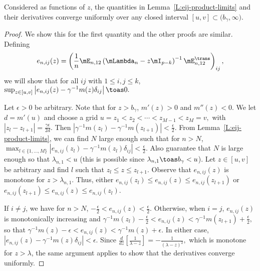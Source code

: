 \begin{lemma}\label{L:eij-product-limits-uniform}
    Considered as functions of $z$, the quantities in 
    Lemma~\ref{L:eij-product-limits} and their derivatives
    converge uniformly over any closed
    interval $[u,v] \subset \big( b_\gamma,\infty \big)$.
\end{lemma}
\begin{proof}
    We show this for the first quantity and the other proofs are similar.
    Defining
    \[
        e_{n,ij}(z)
        =
        \left(
            \frac{1}{n}
            \mE_{n,12}
            \left(
                \mLambda_n - z \mI_{p-k}
            \right)^{-1}
            \mE_{n,12}^\trans
        \right)_{ij},
    \]
    we will show that for all $ij$ with $1 \leq i,j \leq k$, 
    \(
        \sup_{z \in [u,v]} 
            \left|
                e_{n,ij}(z)
                    -
                    \gamma^{-1}
                    m(z)
                    \delta_{ij}
            \right|
            \toas 0.
    \)
    
    Let $\epsilon > 0$ be arbitrary.  Note that for 
    $z > b_\gamma$, $m'(z) > 0$ and $m''(z) < 0$.  We let $d = m'(u)$ and
    choose a grid
    \(
        u = z_1 < z_2 < \cdots < z_{M-1} < z_M = v,
    \)
    with $|z_l - z_{l+1}| = \frac{\gamma \epsilon}{2 d}$.  
    Then $|\gamma^{-1} m(z_l) - \gamma^{-1} m(z_{l+1})| < \frac{\epsilon}{2}$.  
    From 
    Lemma~\ref{L:eij-product-limits}, we can find $N$ large enough such
    that for $n > N$, 
    \(
        \max_{l\in\{1, \ldots, M\}}
            \left|
                e_{n,ij}(z_l)
                    -
                    \gamma^{-1}
                    m(z_l)
                    \delta_{ij}
            \right|
            <
            \frac{\epsilon}{2}.
    \)
    Also guarantee that $N$ is large enough so that $\lambda_{n,1} < u$ 
    (this is possible since $\lambda_{n,1} \toas b_\gamma < u$).
    Let $z \in [u,v]$ be arbitrary and find $l$ such that 
    $z_l \leq z \leq z_{l+1}$.
    Observe that $e_{n,ij}(z)$ is monotone for $z > \lambda_{n,1}$.  Thus,
    either
    \(
        e_{n,ij}(z_l) \leq e_{n,ij}(z) \leq e_{n,ij}(z_{l+1})
    \)
    or
    \(
        e_{n,ij}(z_{l+1}) \leq e_{n,ij}(z) \leq e_{n,ij}(z_{l}).
    \)
    
    If $i \neq j$, we have for $n > N$,
    \(
        -\frac{\epsilon}{2} < e_{n,ij}(z) < \frac{\epsilon}{2}.
    \)
    Otherwise, when $i = j$, $e_{n,ij}(z)$ is 
    monotonically increasing and
    \(
        \gamma^{-1} m(z_l) - \frac{\epsilon}{2}
            <
                e_{n,ij}(z)
                    <
                        \gamma^{-1} m(z_{l+1}) + \frac{\epsilon}{2},
    \)
    so that
    \(
        \gamma^{-1} m(z) - \epsilon
            <
                e_{n,ij}(z)
                    <
                        \gamma^{-1} m(z) + \epsilon.
    \)
    In either case, 
    $|e_{n,ij}(z) - \gamma^{-1} m(z) \delta_{ij}| < \epsilon$.
    Since 
    \(
        \frac{d}{dz} \left[
            \frac{1}{\lambda - z}
        \right]
            =
            -\frac{1}{(\lambda - z)^{2}},
    \)
    which is monotone for $z > \lambda$, the same argument applies to show
    that the derivatives converge uniformly.
\end{proof}


